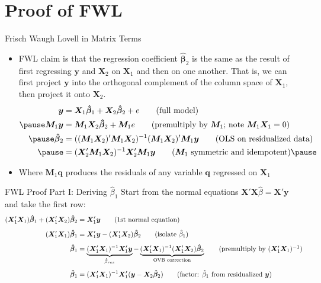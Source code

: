 \documentclass[aspectratio=169, handout, t]{beamer}
\numberwithin{equation}{section}
\begin{document}
\section{Proof of FWL}
\setcounter{subsection}{1}
\begin{frame}{Frisch Waugh Lovell in Matrix Terms}
\begin{itemize}
\item FWL claim is that the regression coefficient $\bm{\hat{\beta}}_2$ is the same as the result of first regressing $\bm{y}$ and $\bm{X}_2$ on $\bm{X}_1$ and then on one another.  That is, we can first project $\bm{y}$ into the orthogonal complement of the column space of $\bm{X}_1$, then project it onto $\bm{X}_2$.
\begin{align*}
\bm{y}&=\bm{X}_1 \bm{\hat{\beta}}_1+\bm{X}_2 \bm{\hat{\beta}}_2+e \tag{full model}\\\pause
\bm{M}_1\bm{y}&=\bm{M}_1 \bm{X}_2 \bm{\hat{\beta}}_2+\bm{M}_1e \tag{premultiply by $\bm{M}_1$; note $\bm{M}_1\bm{X}_1=0$}\\\pause
 \bm{\hat{\beta}}_2&=((\bm{M}_1\bm{X}_2)'\bm{M}_1\bm{X}_2)^{-1}(\bm{M}_1\bm{X}_2)'\bm{M}_1\bm{y} \tag{OLS on residualized data}\\\pause
&=(\bm{X}_2'\bm{M}_1\bm{X}_2)^{-1}\bm{X}'_2\bm{M}_1\bm{y} \tag{$\bm{M}_1$ symmetric and idempotent}\pause
\end{align*}
\item Where $\bm{M}_1\bm{q}$ produces the residuals of any variable $\bm{q}$ regressed on $\bm{X}_1$ 
\end{itemize}
\end{frame}

\begin{frame}{FWL Proof Part I: Deriving $\hat{\beta}_1$}
Start from the normal equations $\bm{X'X}\hat{\beta}=\bm{X'y}$ and take the first row:
\begin{align*}
(\bm{X}_1'\bm{X}_1)\bm{\hat{\beta}}_1+(\bm{X}_1'\bm{X}_2)\bm{\hat{\beta}}_2&=\bm{X}'_1\bm{y} \tag{1st normal equation}\\[4pt]
(\bm{X}_1'\bm{X}_1)\bm{\hat{\beta}}_1&=\bm{X}'_1\bm{y}-(\bm{X}_1'\bm{X}_2)\bm{\hat{\beta}}_2 \tag{isolate $\hat{\beta}_1$}\\[4pt]
\bm{\hat{\beta}}_1&=\underbrace{(\bm{X}_1'\bm{X}_1)^{-1}\bm{X}'_1\bm{y}}_{\hat{\beta}_{res}}-\underbrace{(\bm{X}_1'\bm{X}_1)^{-1}(\bm{X}_1'\bm{X}_2)\bm{\hat{\beta}}_2}_{\text{OVB correction}} \tag{premultiply by $(\bm{X}_1'\bm{X}_1)^{-1}$}\\[4pt]
\bm{\hat{\beta}}_1&=(\bm{X}_1'\bm{X}_1)^{-1}\bm{X}'_1(\bm{y}-\bm{X}_2\bm{\hat{\beta}}_2) \tag{factor: $\hat{\beta}_1$ from residualized $\bm{y}$}
\end{align*}
\end{frame}
\end{document}
